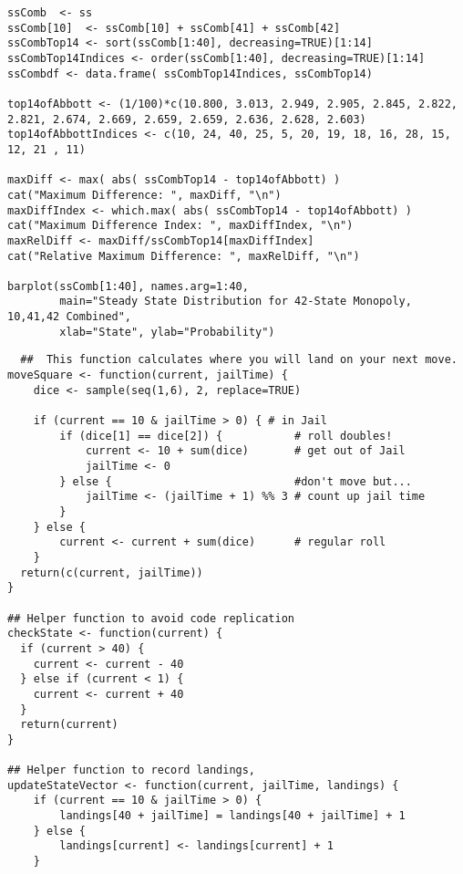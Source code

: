 \begin{description}
\begin{lstlisting}
ssComb  <- ss
ssComb[10]  <- ssComb[10] + ssComb[41] + ssComb[42]
ssCombTop14 <- sort(ssComb[1:40], decreasing=TRUE)[1:14]
ssCombTop14Indices <- order(ssComb[1:40], decreasing=TRUE)[1:14]
ssCombdf <- data.frame( ssCombTop14Indices, ssCombTop14)

top14ofAbbott <- (1/100)*c(10.800, 3.013, 2.949, 2.905, 2.845, 2.822, 2.821, 2.674, 2.669, 2.659, 2.659, 2.636, 2.628, 2.603)
top14ofAbbottIndices <- c(10, 24, 40, 25, 5, 20, 19, 18, 16, 28, 15, 12, 21 , 11)

maxDiff <- max( abs( ssCombTop14 - top14ofAbbott) )
cat("Maximum Difference: ", maxDiff, "\n")
maxDiffIndex <- which.max( abs( ssCombTop14 - top14ofAbbott) )
cat("Maximum Difference Index: ", maxDiffIndex, "\n")
maxRelDiff <- maxDiff/ssCombTop14[maxDiffIndex]
cat("Relative Maximum Difference: ", maxRelDiff, "\n")

barplot(ssComb[1:40], names.arg=1:40,
        main="Steady State Distribution for 42-State Monopoly, 10,41,42 Combined",
        xlab="State", ylab="Probability")
\end{lstlisting}


\begin{lstlisting}
  ##  This function calculates where you will land on your next move.
moveSquare <- function(current, jailTime) {
    dice <- sample(seq(1,6), 2, replace=TRUE)

    if (current == 10 & jailTime > 0) { # in Jail
        if (dice[1] == dice[2]) {           # roll doubles!
            current <- 10 + sum(dice)       # get out of Jail
            jailTime <- 0
        } else {                            #don't move but...
            jailTime <- (jailTime + 1) %% 3 # count up jail time
        } 
    } else {
        current <- current + sum(dice)      # regular roll
    }
  return(c(current, jailTime))
}

## Helper function to avoid code replication
checkState <- function(current) {
  if (current > 40) {
    current <- current - 40
  } else if (current < 1) {
    current <- current + 40
  }
  return(current)
}

## Helper function to record landings, 
updateStateVector <- function(current, jailTime, landings) {
    if (current == 10 & jailTime > 0) {
        landings[40 + jailTime] = landings[40 + jailTime] + 1
    } else {
        landings[current] <- landings[current] + 1
    }
    

\end{lstlisting}
\end{description}
